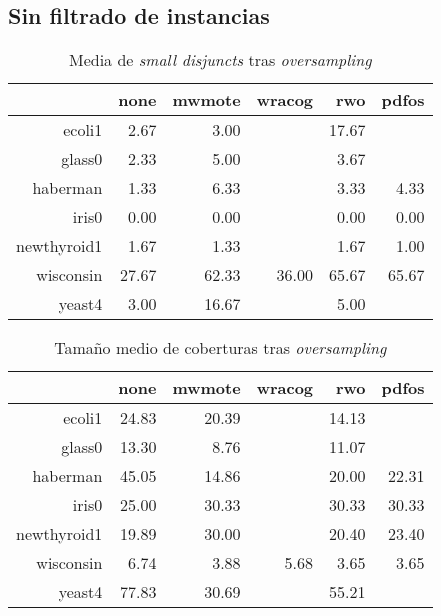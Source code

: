 \subsection{Sin filtrado de instancias}
  \begin{table}[H]
  \centering
  \begin{tabular}{rrrrrr}
  \hline
  & none & mwmote & wracog & rwo & pdfos \\ 
  \hline
  ecoli1 & 2.67 & 3.00 &  & 17.67 &  \\ 
  glass0 & 2.33 & 5.00 &  & 3.67 &  \\ 
  haberman & 1.33 & 6.33 &  & 3.33 & 4.33 \\ 
  iris0 & 0.00 & 0.00 &  & 0.00 & 0.00 \\ 
  newthyroid1 & 1.67 & 1.33 &  & 1.67 & 1.00 \\ 
  wisconsin & 27.67 & 62.33 & 36.00 & 65.67 & 65.67 \\ 
  yeast4 & 3.00 & 16.67 &  & 5.00 &  \\ 
  \hline
  \end{tabular}
  \caption{Media de \textit{small disjuncts} tras \textit{oversampling}}
  \end{table}

  \begin{table}[H]
  \centering
  \begin{tabular}{rrrrrr}
  \hline
  & none & mwmote & wracog & rwo & pdfos \\ 
  \hline
  ecoli1 & 24.83 & 20.39 &  & 14.13 &  \\ 
  glass0 & 13.30 & 8.76 &  & 11.07 &  \\ 
  haberman & 45.05 & 14.86 &  & 20.00 & 22.31 \\ 
  iris0 & 25.00 & 30.33 &  & 30.33 & 30.33 \\ 
  newthyroid1 & 19.89 & 30.00 &  & 20.40 & 23.40 \\ 
  wisconsin & 6.74 & 3.88 & 5.68 & 3.65 & 3.65 \\ 
  yeast4 & 77.83 & 30.69 &  & 55.21 &  \\ 
  \hline
  \end{tabular}
  \caption{Tamaño medio de coberturas tras \textit{oversampling}}
  \end{table}
  
